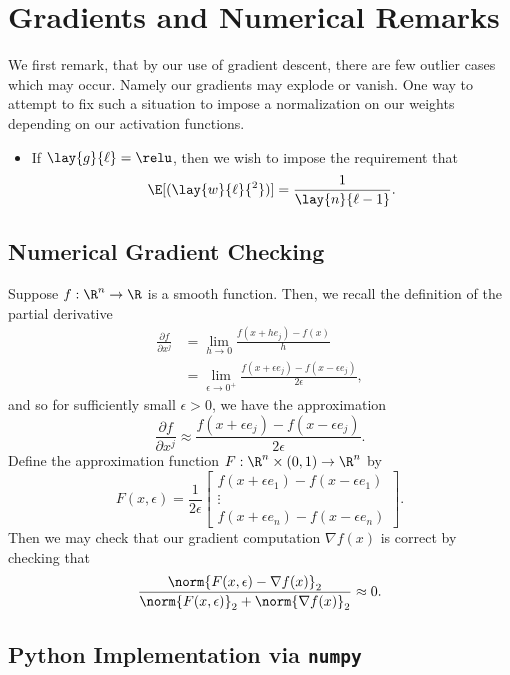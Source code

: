 

\section{Gradients and Numerical Remarks}

We first remark, that by our use of gradient descent, there are few outlier cases which may occur.  Namely our gradients may explode or vanish.  One way to attempt to fix such a situation to impose a normalization on our weights depending on our activation functions.
\begin{itemize}
	\item If $\lay{g}{\ell}=\relu$, then we wish to impose the requirement that
		$$\E[(\lay{w}{\ell}{^2})]=\frac{1}{\lay{n}{\ell-1}}.$$
\end{itemize}


\subsection{Numerical Gradient Checking}

Suppose $f:\R^n\to\R$ is a smooth function.  Then, we recall the definition of the partial derivative
\begin{align*}
	\frac{\partial f}{\partial x^j}&=\lim_{h\to0}\frac{f(x+he_j)-f(x)}{h}\\
	&=\lim_{\epsilon\to0^+}\frac{f(x+\epsilon e_j)-f(x-\epsilon e_j)}{2\epsilon},
\end{align*}
and so for sufficiently small $\epsilon>0$, we have the approximation
$$\frac{\partial f}{\partial x^j}\approx \frac{f(x+\epsilon e_j)-f(x-\epsilon e_j)}{2\epsilon}.$$
Define the approximation function $F:\R^n\times (0,1)\to\R^n$ by
$$F(x,\epsilon)=\frac{1}{2\epsilon}\begin{bmatrix}
	f(x+\epsilon e_1)-f(x-\epsilon e_1)\\
	\vdots\\
	f(x+\epsilon e_n)-f(x-\epsilon e_n)
\end{bmatrix}.$$
Then we may check that our gradient computation $\nabla f(x)$ is correct by checking that
$$\frac{\norm{F(x,\epsilon)-\nabla f(x)}_2}{\norm{F(x,\epsilon)}_2+\norm{\nabla f(x)}_2}\approx 0.$$

\subsection{Python Implementation via \texttt{numpy}}

